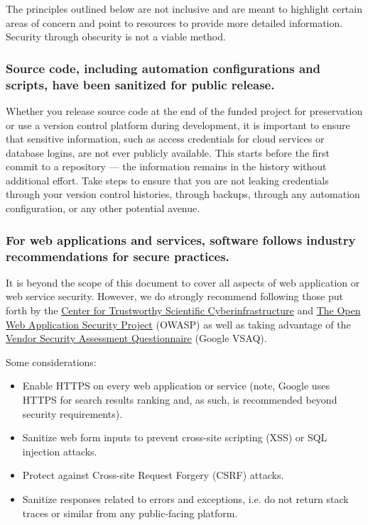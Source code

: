 \documentclass{article}
\begin{document}
The principles outlined below are not inclusive and are meant to highlight certain areas of concern and point to resources to provide more detailed information. Security through obscurity is not a viable method.

\subsubsection{Source code, including automation configurations and scripts, have been sanitized for public release.}
Whether you release source code at the end of the funded project for preservation or use a version control platform during development, it is important to ensure that sensitive information, such as access credentials for cloud services or database logins, are not ever publicly available. This starts before the first commit to a repository — the information remains in the history without additional effort. Take steps to ensure that you are not leaking credentials through your version control histories, through backups, through any automation configuration, or any other potential avenue. 

\subsubsection{For web applications and services, software follows industry recommendations for secure practices.}
It is beyond the scope of this document to cover all aspects of web application or web service security. However, we do strongly recommend following those put forth by the \href{http://trustedci.org/} {Center for Trustworthy Scientific Cyberinfrastructure} and \href{https://www.owasp.org/index.php/Main_Page} {The Open Web Application Security Project} (OWASP) as well as taking advantage of the \href{https://github.com/google/vsaq} {Vendor Security Assessment Questionnaire} (Google VSAQ). 

Some considerations:
\begin{itemize}
\item Enable HTTPS on every web application or service (note, Google uses HTTPS for search results ranking \autocite{bahajji_indexing_2015} and, as such, is recommended beyond security requirements).
\item Sanitize web form inputs to prevent cross-site scripting (XSS) or SQL injection attacks.
\item Protect against Cross-site Request Forgery (CSRF) attacks.
\item Sanitize responses related to errors and exceptions, i.e. do not return stack traces or similar from any public-facing platform.
\end{itemize}
\end{document}
